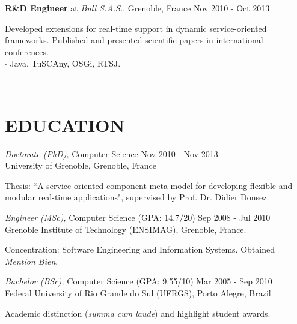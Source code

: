 \documentclass[margin]{res}
\begin{document}
\begin{resume}
			\textbf{R\&D Engineer} at {\sl Bull S.A.S.}, Grenoble, France \hfill Nov 2010 - Oct 2013\\
                 	\begin{small}              
                 		{\color{darkgray} Developed extensions for real-time support in dynamic service-oriented frameworks. Published and presented scientific papers in international conferences.}\\
			         {\color{gray} $\cdot$ Java, TuSCAny, OSGi, RTSJ.}
        		         \end{small}
               		\vspace{1mm}\\
		\vspace{-8mm}
		\section{EDUCATION} {\sl Doctorate (PhD),} Computer Science \hfill Nov 2010 - Nov 2013\\
               		University of Grenoble, Grenoble, France\\
	   		\begin{small}
        	        			{\color{darkgray} Thesis: ``A service-oriented component meta-model for developing flexible and modular real-time applications", supervised by Prof. Dr. Didier Donsez.}
				\vspace{1.5mm}\\                 	            
			\end{small}  	            
        		        {\sl Engineer (MSc),} Computer Science (GPA: 14.7/20) \hfill Sep 2008 - Jul 2010\\
               		Grenoble Institute of Technology (ENSIMAG), Grenoble, France.\\
	               	 \begin{small}
        		       		{\color{darkgray} Concentration: Software Engineering and Information Systems. Obtained \textit{Mention Bien}.}
				\vspace{1.5mm}\\
	               	\end{small}
        		        {\sl Bachelor (BSc),} Computer Science (GPA: 9.55/10) \hfill Mar 2005 - Sep 2010\\
                		Federal University of Rio Grande do Sul (UFRGS), Porto Alegre, Brazil\\
	               	\begin{small}
        		       		{\color{darkgray} Academic distinction (\textit{summa cum laude}) and highlight student awards.}
				\vspace{1.5mm}\\
	               	\end{small}
		\vspace{-8mm}

\end{resume}
\end{document}
